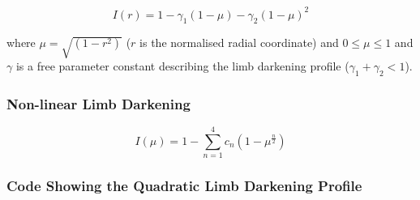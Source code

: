 \documentclass[11pt]{article}
\begin{document}
\begin{equation*}
I(r) = 1 - \gamma_{1}(1 - \mu) - \gamma_{2}(1 - \mu)^{2}
\end{equation*}

where \(\mu = \sqrt{(1 - r^{2})}\) (\(r\) is the normalised radial
coordinate) and \(0 \leqslant \mu \leqslant 1\) and \(\gamma\) is a free
parameter constant describing the limb darkening profile
(\(\gamma_{1} + \gamma_{2} < 1\)).

\hypertarget{non-linear-limb-darkening}{%
\subsubsection{Non-linear Limb Darkening}\label{non-linear-limb-darkening}}

\begin{equation*}
I(\mu) = 1 - \sum_{n = 1}^{4} c_{n}(1 - \mu^{\frac{n}{2}})
\end{equation*}

    \hypertarget{code-showing-the-quadratic-limb-darkening-profile}{%
\subsubsection{Code Showing the Quadratic Limb Darkening Profile}\label{code-showing-the-quadratic-limb-darkening-profile}}
\end{document}
